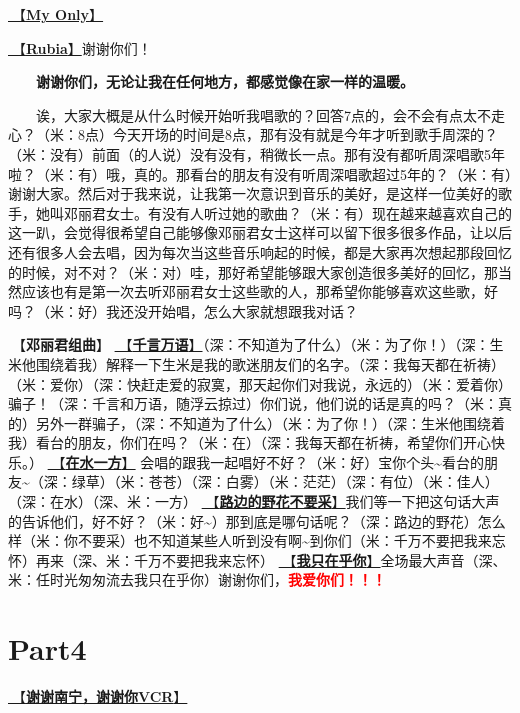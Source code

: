 \documentclass[]{ctexbook}
\begin{document}
\hyperref[my-only]{🎵【\textbf{My Only}】}

\hyperref[rubia]{🎵【\textbf{Rubia}】}谢谢你们！

  \textbf{谢谢你们，无论让我在任何地方，都感觉像在家一样的温暖。}

  诶，大家大概是从什么时候开始听我唱歌的？回答7点的，会不会有点太不走心？（米：8点）今天开场的时间是8点，那有没有就是今年才听到歌手周深的？（米：没有）前面（的人说）没有没有，稍微长一点。那有没有都听周深唱歌5年啦？（米：有）哦，真的。那看台的朋友有没有听周深唱歌超过5年的？（米：有）谢谢大家。然后对于我来说，让我第一次意识到音乐的美好，是这样一位美好的歌手，她叫邓丽君女士。有没有人听过她的歌曲？（米：有）现在越来越喜欢自己的这一趴，会觉得很希望自己能够像邓丽君女士这样可以留下很多很多作品，让以后还有很多人会去唱，因为每次当这些音乐响起的时候，都是大家再次想起那段回忆的时候，对不对？（米：对）哇，那好希望能够跟大家创造很多美好的回忆，那当然应该也有是第一次去听邓丽君女士这些歌的人，那希望你能够喜欢这些歌，好吗？（米：好）我还没开始唱，怎么大家就想跟我对话？

🎵【\textbf{邓丽君组曲}】
\hyperref[thousands-of-words]{🎵【\textbf{千言万语}】}（深：不知道为了什么）（米：为了你！）（深：生米他围绕着我）解释一下生米是我的歌迷朋友们的名字。（深：我每天都在祈祷）（米：爱你）（深：快赶走爱的寂寞，那天起你们对我说，永远的）（米：爱着你）骗子！（深：千言和万语，随浮云掠过）你们说，他们说的话是真的吗？（米：真的）另外一群骗子，（深：不知道为了什么）（米：为了你！）（深：生米他围绕着我）看台的朋友，你们在吗？（米：在）（深：我每天都在祈祷，希望你们开心快乐。）
\hyperref[on-the-water-side]{🎵【\textbf{在水一方}】} 会唱的跟我一起唱好不好？（米：好）宝你个头\textasciitilde 看台的朋友\textasciitilde（深：绿草）（米：苍苍）（深：白雾）（米：茫茫）（深：有位）（米：佳人）（深：在水）（深、米：一方）
\hyperref[only-with-me]{🎵【\textbf{路边的野花不要采}】}我们等一下把这句话大声的告诉他们，好不好？（米：好\textasciitilde）那到底是哪句话呢？（深：路边的野花）怎么样（米：你不要采）也不知道某些人听到没有啊\textasciitilde 到你们（米：千万不要把我来忘怀）再来（深、米：千万不要把我来忘怀）
\hyperref[only-you]{🎵【\textbf{我只在乎你}】}全场最大声音（深、米：任时光匆匆流去我只在乎你）谢谢你们，\textbf{\textcolor{red}{我爱你们！！！}}

\section{Part4}\label{nanning-20241206-part4}

\hyperref[thank-you-vcr]{🎥【\textbf{谢谢南宁，谢谢你VCR}】}
\end{document}
